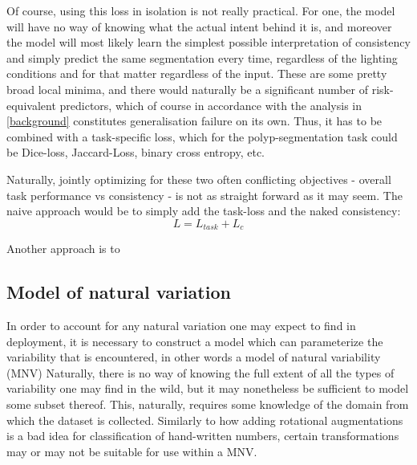 	Of course, using this loss in isolation is not really practical. For one, the model will have no way of knowing what the actual intent behind it is, and moreover the model will most likely learn the simplest possible interpretation of consistency and simply predict the same segmentation every time, regardless of the lighting conditions and for that matter regardless of the input. These are some pretty broad local minima, and there would naturally be a significant number of risk-equivalent predictors, which of course in accordance with the analysis in \ref{background} constitutes generalisation failure on its own. Thus, it has to be combined with a task-specific loss, which for the polyp-segmentation task could be Dice-loss, Jaccard-Loss, binary cross entropy, etc. 
	
	Naturally, jointly optimizing for these two often conflicting objectives - overall task performance vs consistency - is not as straight forward as it may seem. The naive approach would be to simply add the task-loss and the naked consistency:
	\begin{equation}
		L = L_{task} + L_c
	\end{equation}
	
	Another approach is to  
		
	
  	\subsection{Model of natural variation}
  		In order to account for any natural variation one may expect to find in deployment, it is necessary to construct a model which can parameterize the variability that is encountered, in other words a model of natural variability (MNV) Naturally, there is no way of knowing the full extent of all the types of variability one may find in the wild, but it may nonetheless be sufficient to model some subset thereof. This, naturally, requires some knowledge of the domain from which the dataset is collected. Similarly to how adding rotational augmentations is a bad idea for classification of hand-written numbers, certain transformations may or may not be suitable for use within a MNV.
  		
